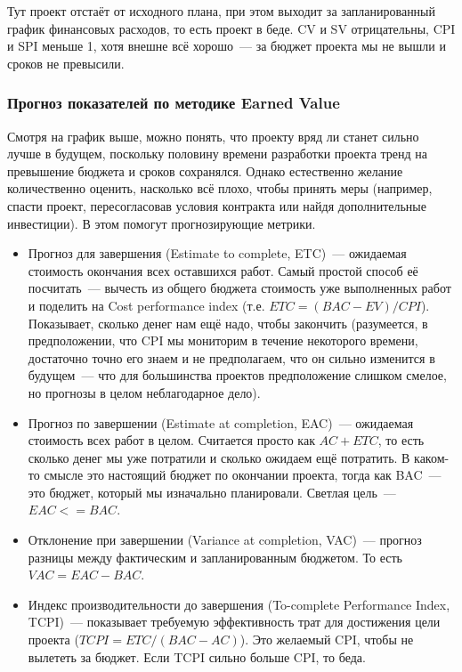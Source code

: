 \documentclass{../../text-style}
\begin{document}
Тут проект отстаёт от исходного плана, при этом выходит за запланированный график финансовых расходов, то есть проект в беде. CV и SV отрицательны, CPI и SPI меньше 1, хотя внешне всё хорошо~--- за бюджет проекта мы не вышли и сроков не превысили.

\subsubsection{Прогноз показателей по методике Earned Value}

Смотря на график выше, можно понять, что проекту вряд ли станет сильно лучше в будущем, поскольку половину времени разработки проекта тренд на превышение бюджета и сроков сохранялся. Однако естественно желание количественно оценить, насколько всё плохо, чтобы принять меры (например, спасти проект, пересогласовав условия контракта или найдя дополнительные инвестиции). В этом помогут прогнозирующие метрики.

\begin{itemize}
    \item Прогноз для завершения (Estimate to complete, ETC)~--- ожидаемая стоимость окончания всех оставшихся работ. Самый простой способ её посчитать~--- вычесть из общего бюджета стоимость уже выполненных работ и поделить на Cost performance index (т.е. $ETC = (BAC - EV) / CPI$). Показывает, сколько денег нам ещё надо, чтобы закончить (разумеется, в предположении, что CPI мы мониторим в течение некоторого времени, достаточно точно его знаем и не предполагаем, что он сильно изменится в будущем~--- что для большинства проектов предположение слишком смелое, но прогнозы в целом неблагодарное дело).
    \item Прогноз по завершении (Estimate at completion, EAC)~--- ожидаемая стоимость всех работ в целом. Считается просто как $AC + ETC$, то есть сколько денег мы уже потратили и сколько ожидаем ещё потратить. В каком-то смысле это настоящий бюджет по окончании проекта, тогда как BAC~--- это бюджет, который мы изначально планировали. Светлая цель~--- $EAC <= BAC$.
    \item Отклонение при завершении (Variance at completion, VAC)~--- прогноз разницы между фактическим и запланированным бюджетом. То есть $VAC = EAC - BAC$.
    \item Индекс производительности до завершения (To-complete Performance Index, TCPI)~--- показывает требуемую эффективность трат для достижения цели проекта ($TCPI =  ETC / (BAC - AC)$). Это желаемый CPI, чтобы не вылететь за бюджет. Если TCPI сильно больше CPI, то беда.
\end{itemize}
\end{document}
